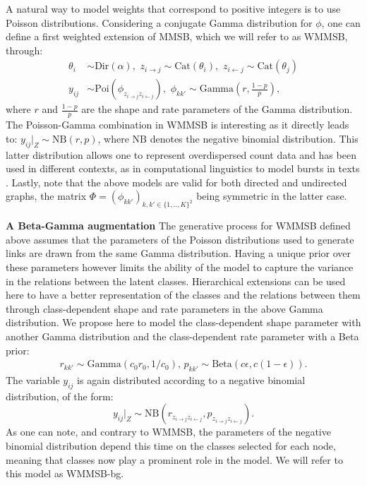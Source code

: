 A natural way to model weights that correspond to positive integers is to use Poisson distributions. Considering a conjugate Gamma distribution for $\phi$, one can define a first weighted extension of MMSB, which we will refer to as WMMSB, through:
%
\begin{align*} \label{eq:generative}
\theta_i & \sim \textrm{Dir}(\alpha), \,\, z_{i\rightarrow j} \sim \textrm{Cat}(\theta_i), \,\, z_{i\leftarrow j} \sim \textrm{Cat}(\theta_j) \\
y_{ij} &\sim \textrm{Poi}(\phi_{z_{i \rightarrow j}z_{i \leftarrow j}}), \,\, \phi_{kk'} \sim \textrm{Gamma}(r, \frac{1-p}{p}),
\end{align*}
%
where $r$ and $\frac{1-p}{p}$ are the shape and rate parameters of the Gamma distribution. The Poisson-Gamma combination in WMMSB is interesting as it directly leads to: $y_{ij}|_{Z} \sim \textrm{NB}(r,p)$, where $\textrm{NB}$ denotes the negative binomial distribution. This latter distribution allows one to represent overdispersed count data and has been used in different contexts, as in computational linguistics to model bursts in texts \cite{church-1995}. Lastly, note that the above models are valid for both directed and undirected graphs, the matrix $\Phi = (\phi_{kk'})_{k,k' \in \{1,..,K\}^2}$ being symmetric in the latter case.

\textbf{A Beta-Gamma augmentation} The generative process for WMMSB defined above assumes that the parameters of the Poisson distributions used to generate links are drawn from the same Gamma distribution. Having a unique prior over these parameters however limits the ability of the model to capture the variance in the relations between the latent classes. Hierarchical extensions can be used here to have a better representation of the classes and the relations between them through class-dependent shape and rate parameters in the above Gamma distribution. We propose here to model the class-dependent shape parameter with another Gamma distribution and the class-dependent rate parameter with a Beta prior:
%
\begin{gather*}
r_{kk'} \sim \textrm{Gamma}(c_0r_0, 1/c_0), \, p_{kk'} \sim \textrm{Beta}(c\epsilon, c(1-\epsilon)).
\end{gather*}
%
The variable $y_{ij}$ is again distributed according to a negative binomial distribution, of the form:
%
\begin{equation}\label{eq:yNB}
y_{ij}|_{Z} \sim \textrm{NB}(r_{z_{i \rightarrow j} z_{i \leftarrow j}},p_{z_{i \rightarrow j} z_{i \leftarrow j}}).
\end{equation}
%
As one can note, and contrary to WMMSB, the parameters of the negative binomial distribution depend this time on the classes selected for each node, meaning that classes now play a prominent role in the model. We will refer to this model as WMMSB-bg.

